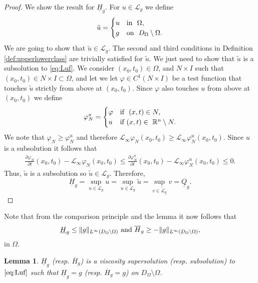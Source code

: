 \documentclass[11pt]{article}
\providecommand{\Linf}{\mathcal{L}_{\infty}}
\providecommand{\Rn}{\mathbb{R}^n}
\providecommand{\Ns}{N \times I}
\providecommand{\RnpO}{D_{\Omega}\setminus \Omega}
\providecommand{\ups}{\overline{H}_g}
\providecommand{\lps}{\underline{H}_g}
\providecommand{\lcg}{\mathcal{L}_g}
\newtheorem{lem}[thm]{Lemma}
\numberwithin{equation}{section}
\theoremstyle{definition}
\begin{document}
\begin{proof}
    We show the result for $\lps$. For $u \in \lcg$ we define
    \begin{align*}
         \tilde{u}= \begin{cases}
            u & \textup{in  } \ \Omega,  \\
            g & \textup{on  } \ \RnpO.
        \end{cases}
    \end{align*}
    We are going to show that $\tilde{u} \in \lcg$. The second and third conditions in Definition \ref{def:upperlowerclass} are trivially satisfied for $\tilde{u}$. We just need to show that $\tilde{u}$ is a subsolution to \eqref{eq:Luf}.  We consider $(x_0, t_0) \in \Omega$, and $\Ns$ such that $(x_0,t_0) \in \Ns \subset \Omega$, and let we let $\varphi \in C^1(\Ns)$ be a test function that touches $\tilde{u}$ strictly from above at $(x_0,t_0)$. Since $\varphi$ also touches $u$ from above at $(x_0,t_0)$ we define 
    \begin{align*}
     \varphi_N^u= \begin{cases}
                      \varphi & \textup{if  } \ (x,t) \in N,\\
                      u & \textup{if  } (x,t) \in \ \Rn   \setminus N.
            \end{cases}
 \end{align*}
 We note that $\varphi_N \geq \varphi^u_N$ and therefore $\Linf \varphi_N(x_0,t_0) \geq \Linf \varphi^u_N(x_0,t_0)$. Since $u$ is a subsolution it follows that 
 \begin{align*}
     \frac{\partial \varphi_N}{\partial t}(x_0,t_0)-\Linf \varphi_N(x_0,t_0) \leq \frac{\partial \varphi_N^u}{\partial t}(x_0,t_0)-\Linf \varphi_N^u(x_0,t_0) \leq 0.
 \end{align*}
 Thus, $\tilde{u}$ is a subsolution so $\tilde{u} \in \lcg$. Therefore,
 \begin{equation*}
     \lps = \sup_{u \in \lcg} u = \sup_{u \in \lcg} \tilde{u} = \sup_{v \in \tilde{\mathcal{L}}_g } v 
     =   \underline{Q}_g.
\end{equation*}
\end{proof}
 Note that from the comparison principle and the lemma it now follows that 
 $$\lps \leq \|g\|_{L^{\infty}(\RnpO)} \textup{ and } \ups \geq -\|g\|_{L^{\infty}(\RnpO)},$$ in $\Omega$.
\begin{lem}\label{lem:subissup}
$\lps$ (resp. $\ups$) is a viscosity supersolution (resp. subsolution) to $\eqref{eq:Luf}$ such that $\lps=g$ (resp. $\ups =g$) on $\RnpO$.
\end{lem}
\end{document}
